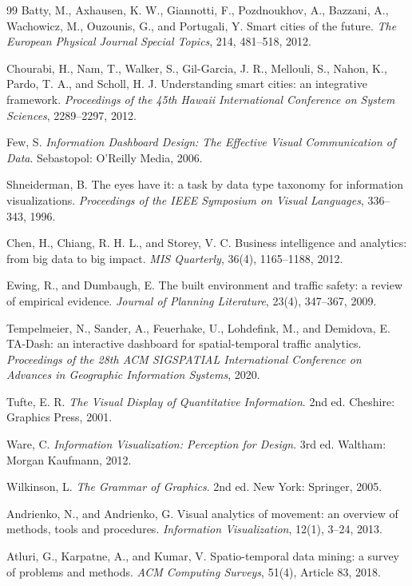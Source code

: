 ﻿\documentclass[12pt,a4paper]{report}
\begin{document}
\begin{thebibliography}{99}
Batty, M., Axhausen, K. W., Giannotti, F., Pozdnoukhov, A., Bazzani, A., Wachowicz, M., Ouzounis, G., and Portugali, Y. Smart cities of the future. \emph{The European Physical Journal Special Topics}, 214, 481--518, 2012.

Chourabi, H., Nam, T., Walker, S., Gil-Garcia, J. R., Mellouli, S., Nahon, K., Pardo, T. A., and Scholl, H. J. Understanding smart cities: an integrative framework. \emph{Proceedings of the 45th Hawaii International Conference on System Sciences}, 2289--2297, 2012.

Few, S. \emph{Information Dashboard Design: The Effective Visual Communication of Data}. Sebastopol: O'Reilly Media, 2006.

Shneiderman, B. The eyes have it: a task by data type taxonomy for information visualizations. \emph{Proceedings of the IEEE Symposium on Visual Languages}, 336--343, 1996.

Chen, H., Chiang, R. H. L., and Storey, V. C. Business intelligence and analytics: from big data to big impact. \emph{MIS Quarterly}, 36(4), 1165--1188, 2012.

Ewing, R., and Dumbaugh, E. The built environment and traffic safety: a review of empirical evidence. \emph{Journal of Planning Literature}, 23(4), 347--367, 2009.

Tempelmeier, N., Sander, A., Feuerhake, U., Lohdefink, M., and Demidova, E. TA-Dash: an interactive dashboard for spatial-temporal traffic analytics. \emph{Proceedings of the 28th ACM SIGSPATIAL International Conference on Advances in Geographic Information Systems}, 2020.

Tufte, E. R. \emph{The Visual Display of Quantitative Information}. 2nd ed. Cheshire: Graphics Press, 2001.

Ware, C. \emph{Information Visualization: Perception for Design}. 3rd ed. Waltham: Morgan Kaufmann, 2012.

Wilkinson, L. \emph{The Grammar of Graphics}. 2nd ed. New York: Springer, 2005.

Andrienko, N., and Andrienko, G. Visual analytics of movement: an overview of methods, tools and procedures. \emph{Information Visualization}, 12(1), 3--24, 2013.

Atluri, G., Karpatne, A., and Kumar, V. Spatio-temporal data mining: a survey of problems and methods. \emph{ACM Computing Surveys}, 51(4), Article 83, 2018.


\end{thebibliography}
\end{document}
